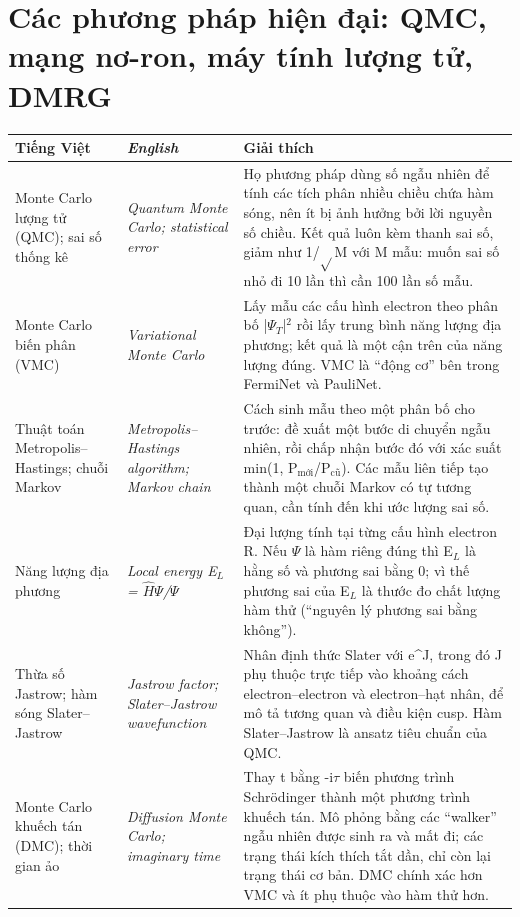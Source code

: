 \section*{Các phương pháp hiện đại: QMC, mạng nơ-ron, máy tính lượng tử, DMRG}
\begin{longtable}{@{}>{\raggedright\arraybackslash}p{}>{\raggedright\arraybackslash\itshape}p{}>{\raggedright\arraybackslash}p{}@{}}
\toprule \textbf{Tiếng Việt} & \textbf{\upshape English} & \textbf{Giải thích} \\ \midrule \endhead
Monte Carlo lượng tử (QMC); sai số thống kê & Quantum Monte Carlo; statistical error & Họ phương pháp dùng số ngẫu nhiên để tính các tích phân nhiều chiều chứa hàm sóng, nên ít bị ảnh hưởng bởi lời nguyền số chiều. Kết quả luôn kèm thanh sai số, giảm như 1/$\sqrt{}$M với M mẫu: muốn sai số nhỏ đi 10 lần thì cần 100 lần số mẫu. \\[2pt]
Monte Carlo biến phân (VMC) & Variational Monte Carlo & Lấy mẫu các cấu hình electron theo phân bố |$\Psi_{T}$|$^{2}$ rồi lấy trung bình năng lượng địa phương; kết quả là một cận trên của năng lượng đúng. VMC là ``động cơ'' bên trong FermiNet và PauliNet. \\[2pt]
Thuật toán Metropolis–Hastings; chuỗi Markov & Metropolis–Hastings algorithm; Markov chain & Cách sinh mẫu theo một phân bố cho trước: đề xuất một bước di chuyển ngẫu nhiên, rồi chấp nhận bước đó với xác suất min(1, P$_{\text{mới}}$/P$_{\text{cũ}}$). Các mẫu liên tiếp tạo thành một chuỗi Markov có tự tương quan, cần tính đến khi ước lượng sai số. \\[2pt]
Năng lượng địa phương & Local energy E$_{L}$ = $\hat H\Psi$/$\Psi$ & Đại lượng tính tại từng cấu hình electron R. Nếu $\Psi$ là hàm riêng đúng thì E$_{L}$ là hằng số và phương sai bằng 0; vì thế phương sai của E$_{L}$ là thước đo chất lượng hàm thử (``nguyên lý phương sai bằng không''). \\[2pt]
Thừa số Jastrow; hàm sóng Slater–Jastrow & Jastrow factor; Slater–Jastrow wavefunction & Nhân định thức Slater với e\textasciicircum{}J, trong đó J phụ thuộc trực tiếp vào khoảng cách electron–electron và electron–hạt nhân, để mô tả tương quan và điều kiện cusp. Hàm Slater–Jastrow là ansatz tiêu chuẩn của QMC. \\[2pt]
Monte Carlo khuếch tán (DMC); thời gian ảo & Diffusion Monte Carlo; imaginary time & Thay t bằng -i$\tau$ biến phương trình Schrödinger thành một phương trình khuếch tán. Mô phỏng bằng các ``walker'' ngẫu nhiên được sinh ra và mất đi; các trạng thái kích thích tắt dần, chỉ còn lại trạng thái cơ bản. DMC chính xác hơn VMC và ít phụ thuộc vào hàm thử hơn. \\[2pt]

\end{longtable}
